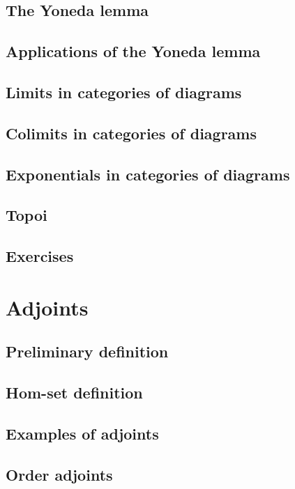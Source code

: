 \documentclass[uplatex, 12pt, dvipdfmx]{jsarticle}
\begin{document}
\subsection{The Yoneda lemma}

\subsection{Applications of the Yoneda lemma}

\subsection{Limits in categories of diagrams}

\subsection{Colimits in categories of diagrams}

\subsection{Exponentials in categories of diagrams}

\subsection{Topoi}

\subsection{Exercises}

\section{Adjoints}

\subsection{Preliminary definition}

\subsection{Hom-set definition}

\subsection{Examples of adjoints}

\subsection{Order adjoints}
\end{document}
